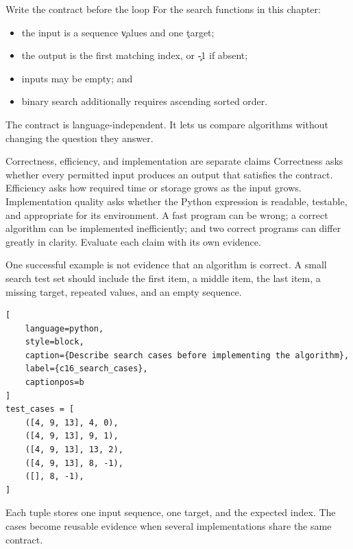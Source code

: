 \begin{SyntaxBox}{Write the contract before the loop}
For the search functions in this chapter:
\begin{itemize}
    \item the input is a sequence \c{values} and one \c{target};
    \item the output is the first matching index, or \c{-1} if absent;
    \item inputs may be empty; and
    \item binary search additionally requires ascending sorted order.
\end{itemize}
The contract is language-independent. It lets us compare algorithms without
changing the question they answer.
\end{SyntaxBox}

\begin{ExplainBox}{Correctness, efficiency, and implementation are separate claims}
Correctness asks whether every permitted input produces an output that satisfies
the contract. Efficiency asks how required time or storage grows as the input
grows. Implementation quality asks whether the Python expression is readable,
testable, and appropriate for its environment. A fast program can be wrong; a
correct algorithm can be implemented inefficiently; and two correct programs
can differ greatly in clarity. Evaluate each claim with its own evidence.
\end{ExplainBox}


One successful example is not evidence that an algorithm is correct. A small
search test set should include the first item, a middle item, the last item, a
missing target, repeated values, and an empty sequence.

\begin{lstlisting}[
    language=python,
    style=block,
    caption={Describe search cases before implementing the algorithm},
    label={c16_search_cases},
    captionpos=b
]
test_cases = [
    ([4, 9, 13], 4, 0),
    ([4, 9, 13], 9, 1),
    ([4, 9, 13], 13, 2),
    ([4, 9, 13], 8, -1),
    ([], 8, -1),
]
\end{lstlisting}

Each tuple stores one input sequence, one target, and the expected index. The
cases become reusable evidence when several implementations share the same
contract.


